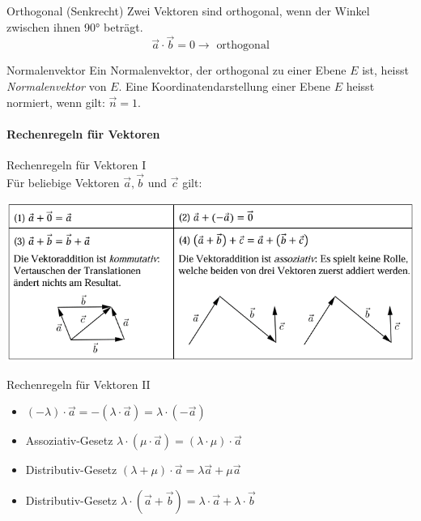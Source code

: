 \begin{definition}{Orthogonal (Senkrecht)}
    Zwei Vektoren sind orthogonal, wenn der Winkel zwischen ihnen 90° beträgt. 
    $$\overrightarrow{a} \cdot \overrightarrow{b} = 0 \rightarrow \text{ orthogonal}$$
\end{definition}

\begin{definition}{Normalenvektor}
    Ein Normalenvektor, der orthogonal zu einer Ebene $E$ ist, heisst \textit{Normalenvektor} von $E$.
    Eine Koordinatendarstellung einer Ebene $E$ heisst normiert, wenn gilt: $\vec{n}=1$.
\end{definition}



\raggedcolumns

\paragraph*{Rechenregeln für Vektoren}

\begin{theorem}{Rechenregeln für Vektoren I}\\
    Für beliebige Vektoren $\vec{a}, \vec{b}$ und $\vec{c}$ gilt:
    \begin{center}
        \includegraphics[width=1\linewidth]{vec-calc-regeln.png}
    \end{center}
\end{theorem}

\begin{theorem}{Rechenregeln für Vektoren II}
    \begin{itemize}
        \item $(-\lambda)\cdot\vec{a}=-(\lambda\cdot\vec{a})=\lambda\cdot(-\vec{a})$
        \item Assoziativ-Gesetz $\lambda\cdot(\mu\cdot\vec{a})=(\lambda\cdot\mu)\cdot\vec{a}$ 
        \item Distributiv-Gesetz $(\lambda+\mu)\cdot\vec{a}=\lambda\vec{a}+\mu\vec{a}$
        \item Distributiv-Gesetz $\lambda\cdot(\vec{a}+\vec{b})=\lambda\cdot\vec{a}+\lambda\cdot\vec{b}$
    \end{itemize}
\end{theorem}

